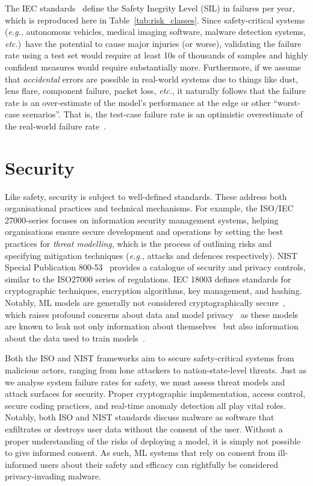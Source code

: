 The IEC standards~\cite{IEC61508} define the Safety Inegrity Level (SIL) in failures per year, which is reproduced here in Table~\ref{tab:risk_classes}. 
Since safety-critical systems (\textit{e.g.}, autonomous vehicles, medical imaging software, malware detection systems, \textit{etc.})~have the potential to cause major injuries (or worse), validating the failure rate using a test set would require at least 10s of thousands of samples and highly confident measures would require substantially more. 
Furthermore, if we assume that \textit{accidental} errors are possible in real-world systems due to things like dust, lens flare, component failure, packet loss, \textit{etc.}, it naturally follows that the failure rate is an over-estimate of the model's performance at the edge or other ``worst-case scenarios''. 
That is, the test-case failure rate is an optimistic overestimate of the real-world failure rate~\cite{azarpromise}. 


\section{Security}

Like safety, security is subject to well-defined standards. These address both organisational practices and technical mechanisms. 
For example, the ISO/IEC 27000-series focuses on information security management systems, helping organisations ensure secure development and operations by setting the best practices for \textit{threat modelling}, which is the process of outlining risks and specifying mitigation techniques (\textit{e.g.}, attacks and defences respectively).
NIST Special Publication 800-53~\cite{todo} provides a catalogue of security and privacy controls, similar to the ISO27000 series of regulations. 
IEC 18003 defines standards for cryptographic techniques, encryption algorithms, key management, and hashing.
Notably, ML models are generally not considered cryptographically secure~\cite{abelson2021bugs}, which raises profound concerns about data and model privacy~\cite{todo} as these models are known to leak not only information about themselves~\cite{todo} but also information about the data used to train models~\cite{todo}.

Both the ISO and NIST frameworks aim to secure safety-critical systems from malicious actors, ranging from lone attackers to nation-state-level threats. 
Just as we analyse system failure rates for safety, we must assess threat models and attack surfaces for security. Proper cryptographic implementation, access control, secure coding practices, and real-time anomaly detection all play vital roles.
Notably, both ISO and NIST standards discuss malware as software that exfiltrates or destroys user data without the consent of the user. 
Without a proper understanding of the risks of deploying a model, it is simply not possible to give informed consent. 
As such, ML systems that rely on consent from ill-informed users about their safety and efficacy can rightfully be considered privacy-invading malware.

